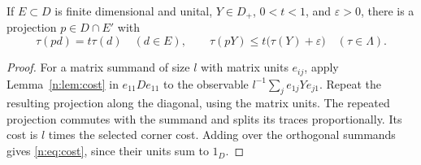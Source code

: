 \begin{corollary}\label{n:cor:cost}
If $E\subset D$ is finite dimensional and unital, $Y\in D_+$,
$0<t<1$, and $\varepsilon>0$, there is a projection $p\in D\cap E'$ with
\begin{equation}\label{n:eq:cost}
 \tau(pd)=t\tau(d)\quad(d\in E),\qquad
 \tau(pY)\le t\bigl(\tau(Y)+\varepsilon\bigr)\quad(\tau\in \Lambda).
\end{equation}
\end{corollary}
\begin{proof}
For a matrix summand of size $l$ with matrix units $e_{ij}$, apply
Lemma~\ref{n:lem:cost} in $e_{11}De_{11}$ to the observable
$l^{-1}\sum_j e_{1j}Ye_{j1}$. Repeat the resulting projection along the
diagonal, using the matrix units. The repeated projection commutes with
the summand and splits its traces proportionally. Its cost is $l$ times
the selected corner cost. Adding over the orthogonal summands gives
\eqref{n:eq:cost}, since their units sum to $1_D$.
\end{proof}
